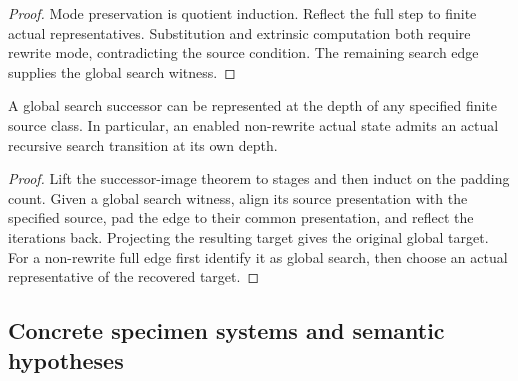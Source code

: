 \begin{proof}
Mode preservation is quotient induction. Reflect the full step to finite actual representatives. Substitution and extrinsic computation both require rewrite mode, contradicting the source condition. The remaining search edge supplies the global search witness.
\end{proof}





\begin{lemma}
A global search successor can be represented at the depth of any specified finite source class. In particular, an enabled non-rewrite actual state admits an actual recursive search transition at its own depth.
\end{lemma}

\begin{proof}
Lift the successor-image theorem to stages and then induct on the padding count. Given a global search witness, align its source presentation with the specified source, pad the edge to their common presentation, and reflect the iterations back. Projecting the resulting target gives the original global target. For a non-rewrite full edge first identify it as global search, then choose an actual representative of the recovered target.
\end{proof}





\subsection{Concrete specimen systems and semantic hypotheses}



